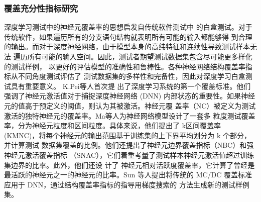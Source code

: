 

\subsubsection{覆盖充分性指标研究}
深度学习测试中的神经元覆盖率的思想启发自传统软件测试中
的白盒测试。对于传统软件，如果遍历所有的分支语句结构就表明所有可能的输入都能够得
到合理的输出。而对于深度神经网络，由于模型本身的高纬特征和连续性导致测试样本无法
遍历所有可能的输入空间。因此，测试者期望测试数据集包含尽可能更多样化的测试样例，
以更好的评估模型的准确性和鲁棒性。各种神经网络结构覆盖率指标从不同角度测试评估了
测试数据集的多样性和完备性，因此对深度学习白盒测试具有重要意义。 K.Pei等人首次提
出了深度学习系统的第一个覆盖标准。他们强调了神经元激活值对于捕捉深度神经网络
(DNN) 内部状态的重要性。如果神经元的值高于预定义的阈值，则认为其被激活。神经元覆
盖率（NC）被定义为测试激活的独特神经元的覆盖率。Ma等人为神经网络模型设计了一套多
粒度测试覆盖率，分为神经元粒度和区间粒度。具体来说，他们提出了 k区间覆盖率
(KMNC)，将每个神经元的输出范围基于训练集的上下界平均划分为 k 个部分，并计算测试
数据集覆盖的比例。他们还提出了神经元边界覆盖指标（NBC）和强神经元激活覆盖指标
（SNAC），它们着重考量了测试样本神经元激活值超过训练集边界的比率。此外，他们还设
计了 神经元相对活跃度覆盖率，它计算了曾经是最活跃的神经元之一的神经元的比率。Sun
等人提出将传统的 MC/DC 覆盖标准应用于 DNN，通过结构覆盖率指标的指导用梯度搜索的
方法生成新的测试样例集。

